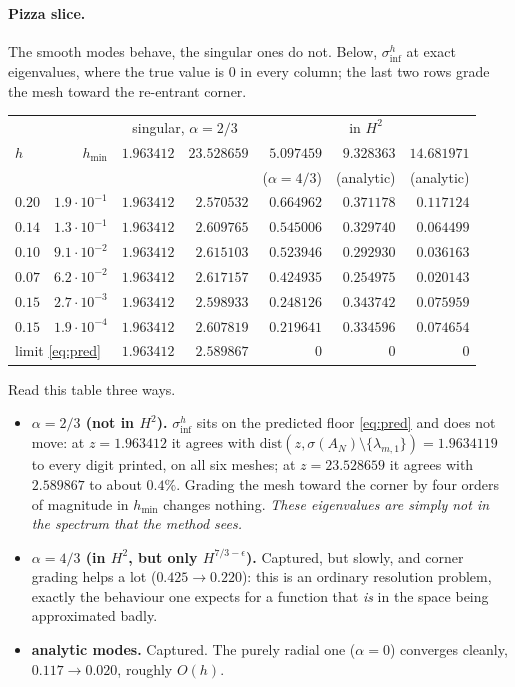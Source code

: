 \documentclass[11pt,a4paper]{article}
\newcommand{\siginf}{\sigma_{\inf}}
\begin{document}
\paragraph{Pizza slice.} The smooth modes behave, the singular ones do not.
Below, $\siginf^h$ at exact eigenvalues, where the true value is $0$ in every
column; the last two rows grade the mesh toward the re-entrant corner.

\begin{center}\small
\begin{tabular}{lr|rr|rrr}
\hline
 & & \multicolumn{2}{c|}{singular, $\alpha=2/3$} & \multicolumn{3}{c}{in $H^2$} \\
$h$ & $h_{\min}$ & $1.963412$ & $23.528659$ & $5.097459$ & $9.328363$ & $14.681971$ \\
 & & & & ($\alpha=4/3$) & (analytic) & (analytic) \\
\hline
$0.20$ & $1.9\cdot10^{-1}$ & $1.963412$ & $2.570532$ & $0.664962$ & $0.371178$ & $0.117124$ \\
$0.14$ & $1.3\cdot10^{-1}$ & $1.963412$ & $2.609765$ & $0.545006$ & $0.329740$ & $0.064499$ \\
$0.10$ & $9.1\cdot10^{-2}$ & $1.963412$ & $2.615103$ & $0.523946$ & $0.292930$ & $0.036163$ \\
$0.07$ & $6.2\cdot10^{-2}$ & $1.963412$ & $2.617157$ & $0.424935$ & $0.254975$ & $0.020143$ \\
\hline
$0.15$ & $2.7\cdot10^{-3}$ & $1.963412$ & $2.598933$ & $0.248126$ & $0.343742$ & $0.075959$ \\
$0.15$ & $1.9\cdot10^{-4}$ & $1.963412$ & $2.607819$ & $0.219641$ & $0.334596$ & $0.074654$ \\
\hline
\multicolumn{2}{l|}{limit \eqref{eq:pred}}
       & $\mathbf{1.963412}$ & $\mathbf{2.589867}$ & $0$ & $0$ & $0$ \\
\hline
\end{tabular}
\end{center}

Read this table three ways.
\begin{itemize}
\item \textbf{$\alpha = 2/3$ (not in $H^2$).} $\siginf^h$ sits on the predicted
  floor \eqref{eq:pred} and does not move: at $z=1.963412$ it agrees with
  $\mathrm{dist}(z,\sigma(A_N)\setminus\{\lambda_{m,1}\}) = 1.9634119$ to every
  digit printed, on all six meshes; at $z = 23.528659$ it agrees with
  $2.589867$ to about $0.4\%$. Grading the mesh toward the corner by four
  orders of magnitude in $h_{\min}$ changes nothing. \emph{These eigenvalues
  are simply not in the spectrum that the method sees.}
\item \textbf{$\alpha = 4/3$ (in $H^2$, but only $H^{7/3-\epsilon}$).} Captured,
  but slowly, and corner grading helps a lot ($0.425 \to 0.220$): this is an
  ordinary resolution problem, exactly the behaviour one expects for a function
  that \emph{is} in the space being approximated badly.
\item \textbf{analytic modes.} Captured. The purely radial one ($\alpha=0$)
  converges cleanly, $0.117 \to 0.020$, roughly $O(h)$.
\end{itemize}
\end{document}
